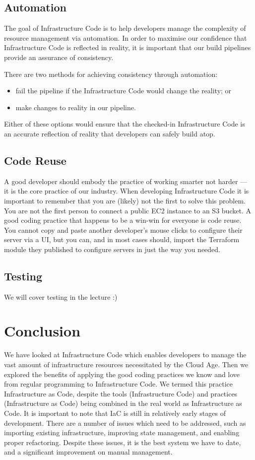 \subsection{Automation}
The goal of Infrastructure Code is to help developers manage the complexity of resource management via automation.
In order to maximise our confidence that Infrastructure Code is reflected in reality,
it is important that our build pipelines provide an assurance of consistency.

There are two methods for achieving consistency through automation:
\begin{itemize}[topsep=5pt,partopsep=2pt,itemsep=3pt,parsep=4pt]
    \item fail the pipeline if the Infrastructure Code would change the reality; or
    \item make changes to reality in our pipeline.
\end{itemize}
Either of these options would ensure that the checked-in Infrastructure Code is an accurate reflection of reality that developers can safely build atop.

\subsection{Code Reuse}
A good developer should embody the practice of working smarter not harder ---
it is the core practice of our industry.
When developing Infrastructure Code it is important to remember that you are (likely) not the first to solve this problem.
You are not the first person to connect a public EC2 instance to an S3 bucket.
A good coding practice that happens to be a win-win for everyone is code reuse.
You cannot copy and paste another developer's mouse clicks to configure their server via a UI,
but you can, and in most cases should,
import the Terraform module they published to configure servers in just the way you needed.

\subsection{Testing}
We will cover testing in the lecture :)


\section{Conclusion}
We have looked at Infrastructure Code which enables developers to manage the vast amount of infrastructure resources necessitated by the Cloud Age.
Then we explored the benefits of applying the good coding practices we know and love from regular programming to Infrastructure Code.
We termed this practice Infrastructure as Code, despite the tools (Infrastructure Code) and practices (Infrastructure as Code)
being combined in the real world as Infrastructure as Code.
It is important to note that IaC is still in relatively early stages of development.
There are a number of issues which need to be addressed, such as importing existing infrastructure,
improving state management, and enabling proper refactoring.
Despite these issues, it is the best system we have to date, and a significant improvement on manual management.

